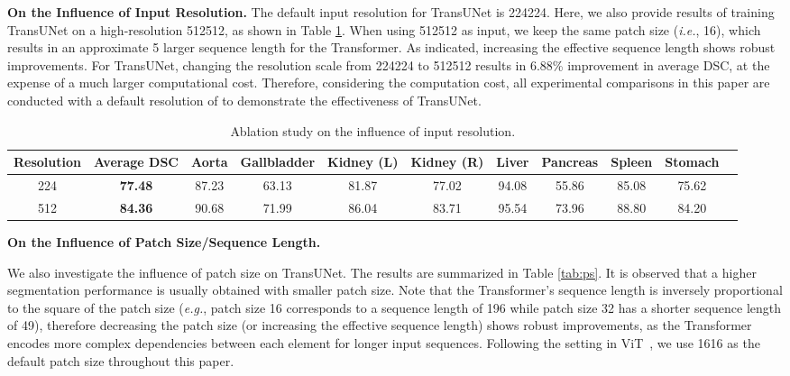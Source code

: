 \documentclass[runningheads]{llncs}
\begin{document}
\vspace{1ex}\noindent\textbf{On the Influence of Input Resolution.}
The default input resolution for TransUNet is 224224. Here, we also provide results of training TransUNet on a high-resolution 512512, as shown in Table \ref{tab:resolution}. When using 512512 as input, we keep the same patch size (\emph{i.e.}, 16), which results in an approximate 5 larger sequence length for the Transformer. As \cite{dosovitskiy2020image} indicated, increasing the effective sequence length shows robust improvements. For TransUNet, changing the resolution scale from 224224 to 512512 results in 6.88\% improvement in average DSC, at the expense of a much larger computational cost. 
Therefore, considering the computation cost, all experimental comparisons in this paper are conducted with a default resolution of  to demonstrate the effectiveness of TransUNet.

\vspace{-1em}
\begin{table}[]
\footnotesize
\resizebox{\textwidth}{!}
{
\begin{tabular}{c|c|ccccccccc}
\hline
Resolution         & Average DSC    & Aorta & Gallbladder & Kidney (L)  & Kidney (R) & Liver & Pancreas & Spleen & Stomach \\ \hline
224   & \textbf{77.48} & 87.23 & 63.13 & 81.87      & 77.02      & 94.08 & 55.86    & 85.08  & 75.62   \\ \hline

512 & \textbf{84.36} & 90.68 & 71.99       & 86.04      & 83.71      & 95.54 & 73.96    & 88.80  & 84.20   \\ \hline
\end{tabular}
}
\caption{Ablation study on the influence of input resolution.}
\label{tab:resolution}
\end{table}

\vspace{-1.5em}
\noindent\textbf{On the Influence of Patch Size/Sequence Length.}

We also investigate the influence of patch size on TransUNet. The results are summarized in Table \ref{tab:ps}. It is
observed that a higher segmentation performance is usually obtained with smaller patch size. 
Note that the Transformer's sequence length is inversely proportional to the square of the patch size (\emph{e.g.}, patch size 16 corresponds to a sequence length of 196 while patch size 32 has a shorter sequence length of 49), therefore decreasing the patch size (or increasing the effective sequence length) shows robust improvements, as the Transformer encodes more complex dependencies between each element for longer input sequences. Following the setting in ViT~\cite{dosovitskiy2020image}, we use 1616 as the default patch size throughout this paper. 
\end{document}

